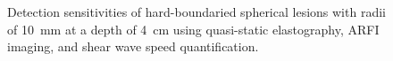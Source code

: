 \documentclass{article}
\begin{document}
			\begin{figure}[!htb]
				\centering
				\caption[Detection sensitivities of hard-boundaried spherical lesions using the three investigated imaging modalities]{Detection sensitivities of hard-boundaried spherical lesions with radii of \SI{10}{\mm} at a depth of \SI{4}{\cm} using quasi-static elastography, ARFI imaging, and shear wave speed quantification.}
				\label{fig:conclusion_radius}
			\end{figure}
\end{document}
